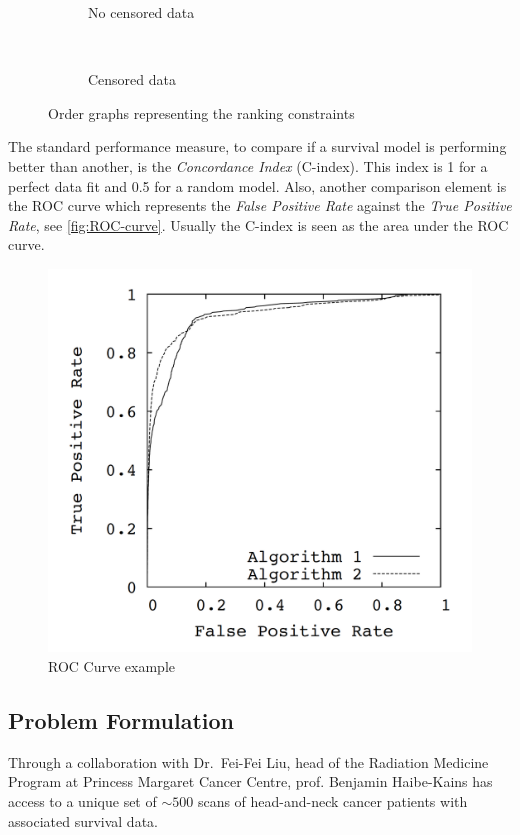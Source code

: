 \begin{figure}
  \centering
  \begin{subfigure}[b]{.4\textwidth}
    \centering
    
    \caption{No censored data}
  \end{subfigure}
  ~
  \begin{subfigure}[b]{.4\textwidth}
    \centering
    
    \caption{Censored data}
  \end{subfigure}

  \caption{Order graphs representing the ranking constraints \label{fig:graph}}
\end{figure}

The standard performance measure, to compare if a survival 
model is performing better than another, is the \emph{Concordance Index} (C-index). This 
index is 1 for a perfect data fit and 0.5 for a random model. Also, another comparison 
element is the ROC curve which represents the \emph{False Positive Rate} against the 
\emph{True Positive Rate}, see \autoref{fig:ROC-curve}. Usually the C-index is seen as 
the area under the ROC curve.
~\cites{neural:roc-precision-recall}{medical:ranking-ci}

\begin{figure}
  \centering
  \includegraphics[width=.5\linewidth]{images/roc_curve}
  \caption{ROC Curve example\label{fig:ROC-curve}}
\end{figure}

\subsection{Problem Formulation}

Through a collaboration with Dr.~Fei-Fei Liu, head of the Radiation Medicine Program at Princess
Margaret Cancer Centre, prof. Benjamin Haibe-Kains has access to a unique set of \( {\sim}500 \) 
scans of head-and-neck cancer patients with associated survival data. 

